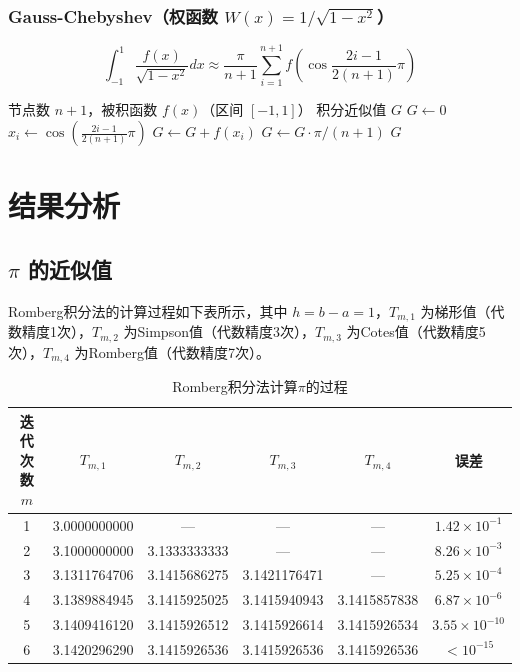 \documentclass{article}
\begin{document}
\subsubsection{Gauss-Chebyshev（权函数 \(W(x)=1/\sqrt{1-x^2}\)）}
\[
\int_{-1}^1 \frac{f(x)}{\sqrt{1-x^2}}dx \approx \frac{\pi}{n+1} \sum_{i=1}^{n+1} f\left(\cos\frac{2i-1}{2(n+1)}\pi\right)
\]

\begin{algorithm}[H]
\caption{Gauss-Chebyshev 求积}
\begin{algorithmic}[1]
\REQUIRE 节点数 \(n+1\)，被积函数 \(f(x)\)（区间 \([-1,1]\)）
\ENSURE 积分近似值 \(G\)
\STATE \(G \gets 0\)
    \STATE \(x_i \gets \cos\left(\frac{2i-1}{2(n+1)}\pi\right)\)
    \STATE \(G \gets G + f(x_i)\)
\ENDFOR
\STATE \(G \gets G \cdot \pi / (n+1)\)
\RETURN \(G\)
\end{algorithmic}
\end{algorithm}


\section{结果分析}
\subsection{ $\pi$ 的近似值}
Romberg积分法的计算过程如下表所示，其中 $h = b-a = 1$，$T_{m,1}$ 为梯形值（代数精度1次），$T_{m,2}$ 为Simpson值（代数精度3次），$T_{m,3}$ 为Cotes值（代数精度5次），$T_{m,4}$ 为Romberg值（代数精度7次）。

\begin{table}[H]
\centering
\caption{Romberg积分法计算$\pi$的过程}
\begin{tabular}{cccccc}
\toprule
迭代次数 $m$ & $T_{m,1}$ & $T_{m,2}$ & $T_{m,3}$ & $T_{m,4}$ & 误差 \\
\midrule
1 & 3.0000000000 & — & — & — & $1.42\times10^{-1}$ \\
2 & 3.1000000000 & 3.1333333333 & — & — & $8.26\times10^{-3}$ \\
3 & 3.1311764706 & 3.1415686275 & 3.1421176471 & — & $5.25\times10^{-4}$ \\
4 & 3.1389884945 & 3.1415925025 & 3.1415940943 & 3.1415857838 & $6.87\times10^{-6}$ \\
5 & 3.1409416120 & 3.1415926512 & 3.1415926614 & 3.1415926534 & $3.55\times10^{-10}$ \\
6 & 3.1420296290 & 3.1415926536 & 3.1415926536 & 3.1415926536 & $<10^{-15}$ \\
\bottomrule
\end{tabular}
\end{table}
\end{document}
